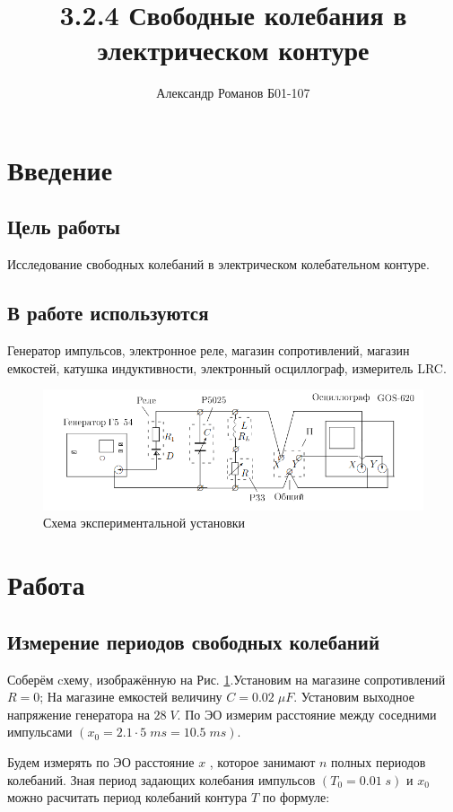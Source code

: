 \documentclass{article}
\author{Александр Романов Б01-107}
\date{}
\title{3.2.4 Свободные колебания в электрическом контуре}
\begin{document}
\maketitle
\section{Введение}
\subsection{Цель работы}
Исследование свободных колебаний в электрическом коле­бательном контуре.
\subsection{В работе используются}
Генератор импульсов, электронное реле, магазин сопротивлений, магазин емкостей, катушка индуктивности, электронный осциллограф, измеритель LRC. 
\begin{figure}[H]
    \includegraphics[width=\textwidth]{scheme.png}
    \caption{Схема экспериментальной установки}
    \label{fig:sheme}
\end{figure}

\section{Работа}
\subsection{Измерение периодов свободных колебаний}

Соберём cхему, изображённую на Рис. \ref{fig:sheme}.Установим на магазине сопротивлений \(R = 0\); На магазине емкостей
величину \( C = 0.02\; \mu F \). Установим выходное напряжение генератора на \( 28\; V \). По ЭО измерим расстояние между соседними
импульсами \( (x_0 = 2.1 \cdot 5\; ms = 10.5\; ms ) \).

Будем измерять по ЭО расстояние \( x \) , которое занимают \( n \) полных периодов колебаний. Зная период задающих
колебания импульсов \( ( T_0 = 0.01\; s ) \) и \( x_0 \) можно расчитать период колебаний контура \( T \) по формуле:
\end{document}
